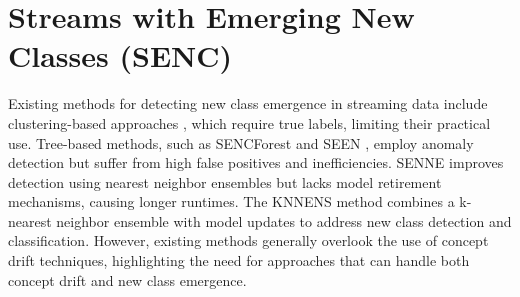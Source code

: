 \section{Streams with Emerging New Classes (SENC)}
\label{sec:3_4_emergence}
Existing methods for detecting new class emergence in streaming data include clustering-based approaches , which require true labels, limiting their practical use. Tree-based methods, such as SENCForest \cite{mu2017classification} and SEEN \cite{zhu2020semi}, employ anomaly detection but suffer from high false positives and inefficiencies. SENNE \cite{cai2019nearest} improves detection using nearest neighbor ensembles but lacks model retirement mechanisms, causing longer runtimes. The KNNENS \cite{zhang2022knnens} method combines a k-nearest neighbor ensemble with model updates to address new class detection and classification. However, existing methods generally overlook the use of concept drift techniques, highlighting the need for approaches that can handle both concept drift and new class emergence.
